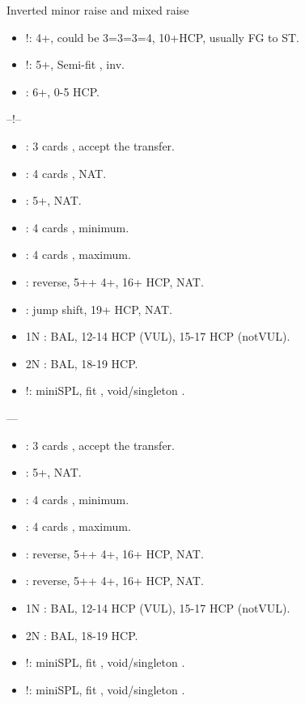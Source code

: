 \documentclass[12pt,twoside,a5paper]{report}%
\begin{document}
	Inverted minor raise and mixed raise
	\begin{itemize}
	\renewcommand{\labelitemi}{}
	\item {}!: 4+\cl{}, could be 3=3=3=4, 10+HCP, usually FG to ST. 
	\item {}!: 5+\cl{}, Semi-fit \cl{}, inv.  
	\item {} : 6+\cl{}, 0-5 HCP. 
	\end{itemize}

	--!--
	\begin{itemize}
	\renewcommand{\labelitemi}{}
	\item {} : 3 cards \he{}, accept the transfer.
	\item {} : 4 cards \sp{}, NAT.
	\item {} : 5+\cl{}, NAT.
	\item {} : 4 cards \he{}, minimum.
	\item {} : 4 cards \he{}, maximum.
	\item {} : reverse, 5+\cl{}+ 4+\di{}, 16+ HCP, NAT.
	\item {} : jump shift, 19+ HCP, NAT. 
	\item 1N : BAL, 12-14 HCP (VUL), 15-17 HCP (notVUL).
	\item 2N : BAL, 18-19 HCP.
	\item {}!: miniSPL, fit \he{}, void/singleton \di{}.
	\end{itemize}

	----
	\begin{itemize}
	\renewcommand{\labelitemi}{}
	\item {} : 3 cards \sp{}, accept the transfer.
	\item {} : 5+\cl{}, NAT.
	\item {} : 4 cards \sp{}, minimum.
	\item {} : 4 cards \sp{}, maximum.
	\item {} :  reverse, 5+\cl{}+ 4+\di{}, 16+ HCP, NAT.
	\item {} :  reverse, 5+\cl{}+ 4+\he{}, 16+ HCP, NAT.
	\item 1N : BAL, 12-14 HCP (VUL), 15-17 HCP (notVUL).
	\item 2N : BAL, 18-19 HCP.	
	\item {}!: miniSPL, fit \sp{}, void/singleton \di{}.
	\item {}!: miniSPL, fit \sp{}, void/singleton \he{}.
	\end{itemize}
\end{document}
